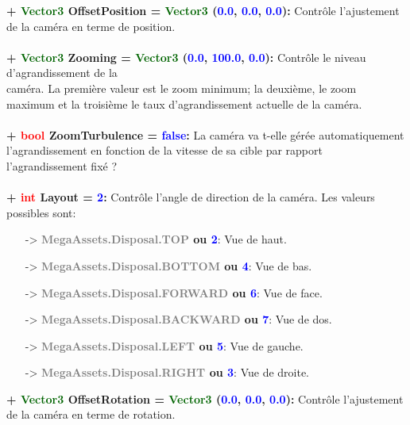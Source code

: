 \documentclass[a4paper, 11pt]{article}
\begin{document}
	\textbf{+ \textcolor{darkgreen}{Vector3} \hypertarget{ofstpos}{OffsetPosition} = \textcolor{darkgreen}
	{Vector3} (\textcolor{blue}{0.0}, \textcolor{blue}{0.0}, \textcolor{blue}{0.0}):} Contrôle l'ajustement 
	de la caméra en terme de position.\\\\
	\textbf{+ \textcolor{darkgreen}{Vector3} Zooming = \textcolor{darkgreen}{Vector3} (\textcolor{blue}
	{0.0}, \textcolor{blue}{100.0}, \textcolor{blue}{0.0}):} Contrôle le niveau d'agrandissement de la 
	\\caméra. La première valeur est le zoom minimum; la deuxième, le zoom maximum et la troisième le taux 
	d'agrandissement actuelle de la caméra.\\\\
	\textbf{+ \textcolor{red}{bool} ZoomTurbulence = \textcolor{blue}{false}:} La caméra va t-elle gérée 
	automatiquement l'agrandissement en fonction de la vitesse de sa cible par rapport l'agrandissement fixé 
	?\\\\
	\textbf{+ \textcolor{red}{int} Layout = \textcolor{blue}{2}:} Contrôle l'angle de direction de la 
	caméra. Les valeurs possibles sont:
	\begin{itemize}
		\item [-> \textbf{\textcolor{gray}{MegaAssets.Disposal.TOP} ou \textcolor{blue}{2}}:] Vue de haut.
		\item [-> \textbf{\textcolor{gray}{MegaAssets.Disposal.BOTTOM} ou \textcolor{blue}{4}}:] Vue de bas.
		\item [-> \textbf{\textcolor{gray}{MegaAssets.Disposal.FORWARD} ou \textcolor{blue}{6}}:] Vue de
		face.
		\item [-> \textbf{\textcolor{gray}{MegaAssets.Disposal.BACKWARD} ou \textcolor{blue}{7}}:] Vue de
		dos.
		\item [-> \textbf{\textcolor{gray}{MegaAssets.Disposal.LEFT} ou \textcolor{blue}{5}}:] Vue de
		gauche.
		\item [-> \textbf{\textcolor{gray}{MegaAssets.Disposal.RIGHT} ou \textcolor{blue}{3}}:] Vue de
		droite.\\
	\end{itemize}
	\textbf{+ \textcolor{darkgreen}{Vector3} \hypertarget{ofstrot}{OffsetRotation} = \textcolor{darkgreen}
	{Vector3} (\textcolor{blue}{0.0}, \textcolor{blue}{0.0}, \textcolor{blue}{0.0}):} Contrôle l'ajustement 
	de la caméra en terme de rotation.\\\\
\end{document}
